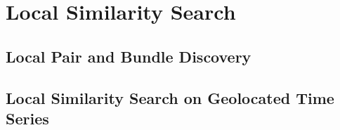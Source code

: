 
\chapter{Local Similarity Search}\label{chap:local_sim}



\section{Local Pair and Bundle Discovery}
\label{sec:pair_bundle_disc}




\section{Local Similarity Search on Geolocated Time Series}
\label{sec:geoTS_sim_search}




